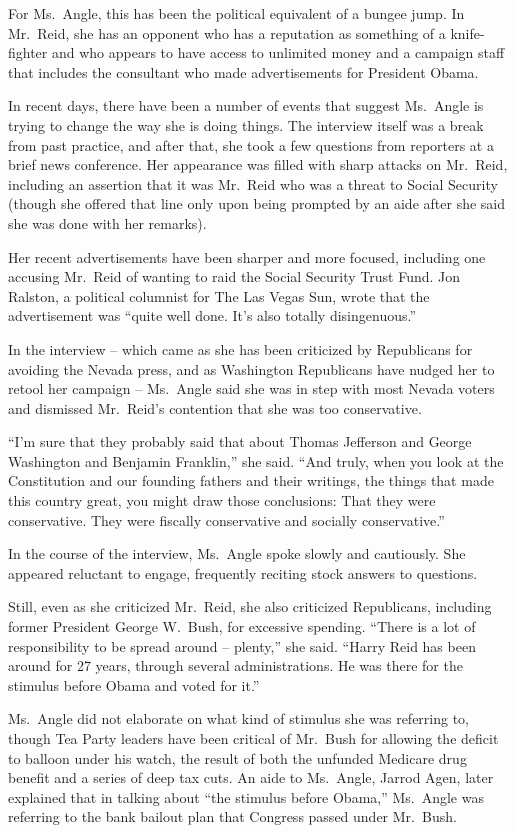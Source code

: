 ﻿\documentclass[12pt]{article}
\begin{document}
For Ms.~Angle, this has been the political equivalent of a bungee jump. In Mr.~Reid, she has an
opponent who has a reputation as something of a knife-fighter and who appears to have access to
unlimited money and a campaign staff that includes the consultant who made advertisements for
President Obama.

In recent days, there have been a number of events that suggest Ms.~Angle is trying to change the
way she is doing things. The interview itself was a break from past practice, and after that, she
took a few questions from reporters at a brief news conference. Her appearance was filled with sharp
attacks on Mr.~Reid, including an assertion that it was Mr.~Reid who was a threat to Social Security
(though she offered that line only upon being prompted by an aide after she said she was done with
her remarks).

Her recent advertisements have been sharper and more focused, including one accusing Mr.~Reid of
wanting to raid the Social Security Trust Fund. Jon Ralston, a political columnist for The Las Vegas
Sun, wrote that the advertisement was ``quite well done. It's also totally disingenuous.''

In the interview -- which came as she has been criticized by Republicans for avoiding the Nevada
press, and as Washington Republicans have nudged her to retool her campaign -- Ms.~Angle said she
was in step with most Nevada voters and dismissed Mr.~Reid's contention that she was too
conservative.

``I'm sure that they probably said that about Thomas Jefferson and George Washington and Benjamin
Franklin,'' she said. ``And truly, when you look at the Constitution and our founding fathers and
their writings, the things that made this country great, you might draw those conclusions: That they
were conservative. They were fiscally conservative and socially conservative.''

In the course of the interview, Ms.~Angle spoke slowly and cautiously. She appeared reluctant to
engage, frequently reciting stock answers to questions.

Still, even as she criticized Mr.~Reid, she also criticized Republicans, including former President
George W.~Bush, for excessive spending. ``There is a lot of responsibility to be spread around --
plenty,'' she said. ``Harry Reid has been around for 27 years, through several administrations. He
was there for the stimulus before Obama and voted for it.''

Ms.~Angle did not elaborate on what kind of stimulus she was referring to, though Tea Party leaders
have been critical of Mr.~Bush for allowing the deficit to balloon under his watch, the result of
both the unfunded Medicare drug benefit and a series of deep tax cuts. An aide to Ms.~Angle, Jarrod
Agen, later explained that in talking about ``the stimulus before Obama,'' Ms.~Angle was referring
to the bank bailout plan that Congress passed under Mr.~Bush.
\end{document}
